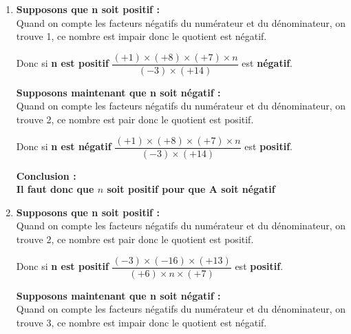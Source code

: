 \begin{corrige}
        \begin{enumerate}
            \item {\bfseries \color[HTML]{f15929}Supposons que n soit positif : }\\
            Quand on compte les facteurs négatifs du numérateur et du dénominateur, on trouve 1, ce nombre est impair donc le quotient est négatif.
           
           \medskip
            Donc si {\bfseries \color{black}n est positif} $ \dfrac {(+1)\times (+8)\times (+7)\times n}{(-3)\times (+14)} $ est {\bfseries \color{black}négatif}.
           
           \medskip
            {\bfseries \color[HTML]{f15929}Supposons maintenant que n soit négatif : }\\
            Quand on compte les facteurs négatifs du numérateur et du dénominateur, on trouve 2, ce nombre est pair donc le quotient est positif.
           
           \medskip
            Donc si {\bfseries \color{black}n est négatif} $ \dfrac {(+1)\times (+8)\times (+7)\times n}{(-3)\times (+14)} $ est {\bfseries \color{black}positif}.
           
           \medskip
            {\bfseries \color[HTML]{f15929}Conclusion :} \\
           {\bfseries \color{black}Il faut donc que $ n $ soit positif pour que A soit négatif}
            \item {\bfseries \color[HTML]{f15929}Supposons que n soit positif : }\\
            Quand on compte les facteurs négatifs du numérateur et du dénominateur, on trouve 2, ce nombre est pair donc le quotient est positif.
           
           \medskip
            Donc si {\bfseries \color{black}n est positif} $ \dfrac {(-3)\times (-16)\times (+13)}{(+6)\times n\times (+7)} $ est {\bfseries \color{black}positif}.
           
           \medskip
            {\bfseries \color[HTML]{f15929}Supposons maintenant que n soit négatif : }\\
            Quand on compte les facteurs négatifs du numérateur et du dénominateur, on trouve 3, ce nombre est impair donc le quotient est négatif.
           

\end{enumerate}
\end{corrige}
